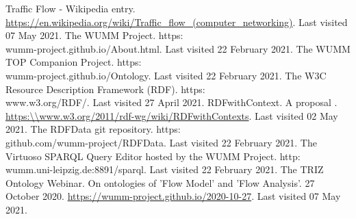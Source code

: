 \documentclass[a4paper,11pt]{article}
\begin{document}
\begin{thebibliography}{...}
     Traffic Flow - Wikipedia entry.
        \url{https://en.wikipedia.org/wiki/Traffic_flow_(computer_networking)}. Last visited 07 May 2021.
     The WUMM Project. https:\\wumm-project.github.io/About.html. Last visited 22 February 2021.
     The WUMM TOP Companion Project. https:\\wumm-project.github.io/Ontology. Last visited 22 February 2021.
     The W3C Resource Description Framework (RDF). https:\\www.w3.org/RDF/. Last visited 27 April 2021.
     RDFwithContext. A proposal . 
        \url{https:\\www.w3.org/2011/rdf-wg/wiki/RDFwithContexts}. Last visited 02 May 2021.
     The RDFData git repository. https:\\github.com/wumm-project/RDFData.  Last visited 22 February 2021.
     The Virtuoso SPARQL Query Editor hosted by the WUMM Project. http:\\wumm.uni-leipzig.de:8891/sparql. Last visited 22 February 2021. 
     The TRIZ Ontology Webinar. On ontologies of 'Flow Model' and 'Flow Analysis'. 27 October 2020.
        \url{https://wumm-project.github.io/2020-10-27}. Last visited 07 May 2021.
\end{thebibliography}
\end{document}
